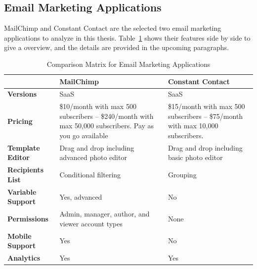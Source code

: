 \subsection{Email Marketing Applications}
\label{subsec:3.1.3:EmaiMarktAppl}

MailChimp and Constant Contact are the selected two email marketing applications to analyze in this thesis. Table~\ref{tab:comp_matr_emai} shows their features side by side to give a overview, and the details are provided in the upcoming paragraphs.

\begin{table}[!ht]
\begin{center}
	\caption[Comparison Matrix for Email Marketing Applications]{Comparison Matrix for Email Marketing Applications} \label{tab:comp_matr_emai}
    \begin{tabular}{ | p{3cm} | p{5cm} | p{5cm} | }
	\hline
	& \textbf{MailChimp} & \textbf{Constant Contact} \\ \hline
	\textbf{Versions} & SaaS & SaaS \\ \hline
	\textbf{Pricing} & \$10/month with max 500 subscribers -- \$240/month with max 50,000 subscribers. Pay as you go available & \$15/month with max 500 subscribers -- \$75/month with max 10,000 subscribers. \\ \hline
	\textbf{Template Editor} & Drag and drop including advanced photo editor & Drag and drop including basic photo editor \\ \hline
	\textbf{Recipients List} & Conditional filtering & Grouping \\ \hline
	\textbf{Variable Support} & Yes, advanced & No \\ \hline
	\textbf{Permissions} & Admin, manager, author, and viewer account types & None \\ \hline
	\textbf{Mobile Support} & Yes & No \\ \hline
	\textbf{Analytics} & Yes & Yes \\ \hline
    \end{tabular}
\end{center}
\end{table}

